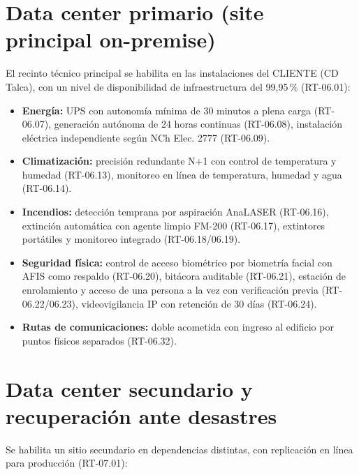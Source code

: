 \section{Data center primario (site principal on-premise)}

El recinto técnico principal se habilita en las instalaciones del CLIENTE (CD Talca),
con un nivel de disponibilidad de infraestructura del 99,95\,\% (RT-06.01):


\begin{itemize}
  \item \textbf{Energía:} UPS con autonomía mínima de 30 minutos a plena carga
        (RT-06.07), generación autónoma de 24 horas continuas (RT-06.08), instalación
        eléctrica independiente según NCh Elec. 2777 (RT-06.09).
  \item \textbf{Climatización:} precisión redundante N+1 con control de temperatura y
        humedad (RT-06.13), monitoreo en línea de temperatura, humedad y agua
        (RT-06.14).
  \item \textbf{Incendios:} detección temprana por aspiración AnaLASER (RT-06.16),
        extinción automática con agente limpio FM-200 (RT-06.17), extintores portátiles y
        monitoreo integrado (RT-06.18/06.19).
  \item \textbf{Seguridad física:} control de acceso biométrico por biometría facial con
        AFIS como respaldo (RT-06.20), bitácora auditable (RT-06.21), estación de
        enrolamiento y acceso de una persona a la vez con verificación previa
        (RT-06.22/06.23), videovigilancia IP con retención de 30 días (RT-06.24).
  \item \textbf{Rutas de comunicaciones:} doble acometida con ingreso al edificio por
        puntos físicos separados (RT-06.32).
\end{itemize}

\section{Data center secundario y recuperación ante desastres}

Se habilita un sitio secundario en dependencias distintas, con replicación en línea para
producción (RT-07.01):

